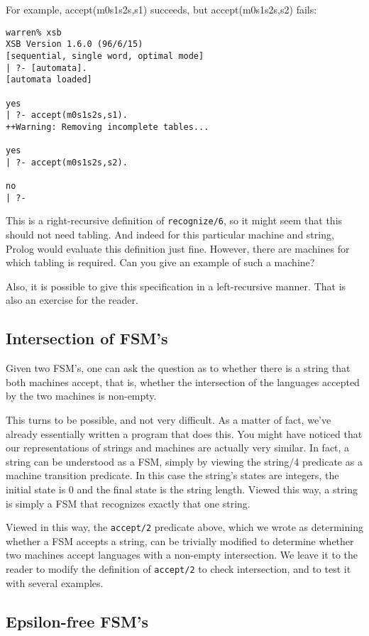 For example, accept(m0s1s2s,s1) succeeds, but accept(m0s1s2s,s2)
fails:
\begin{verbatim}
warren% xsb
XSB Version 1.6.0 (96/6/15)
[sequential, single word, optimal mode]
| ?- [automata].
[automata loaded]

yes
| ?- accept(m0s1s2s,s1).
++Warning: Removing incomplete tables...

yes
| ?- accept(m0s1s2s,s2).

no
| ?- 
\end{verbatim}

This is a right-recursive definition of \verb|recognize/6|, so it
might seem that this should not need tabling.  And indeed for this
particular machine and string, Prolog would evaluate this definition
just fine.  However, there are machines for which tabling is required.
Can you give an example of such a machine?

Also, it is possible to give this specification in a left-recursive
manner.  That is also an exercise for the reader.

\subsection{Intersection of FSM's}

Given two FSM's, one can ask the question as to whether there is a
string that both machines accept, that is, whether the intersection of
the languages accepted by the two machines is non-empty.

This turns to be possible, and not very difficult.  As a matter of
fact, we've already essentially written a program that does this.  You
might have noticed that our representations of strings and machines
are actually very similar.  In fact, a string can be understood as a
FSM, simply by viewing the string/4 predicate as a machine transition
predicate.  In this case the string's states are integers, the initial
state is 0 and the final state is the string length.  Viewed this way,
a string is simply a FSM that recognizes exactly that one string.

Viewed in this way, the \verb|accept/2| predicate above, which we wrote
as determining whether a FSM accepts a string, can be trivially
modified to determine whether two machines accept languages with a
non-empty intersection.  We leave it to the reader to modify the
definition of \verb|accept/2| to check intersection, and to test it
with several examples.

\subsection{Epsilon-free FSM's}

